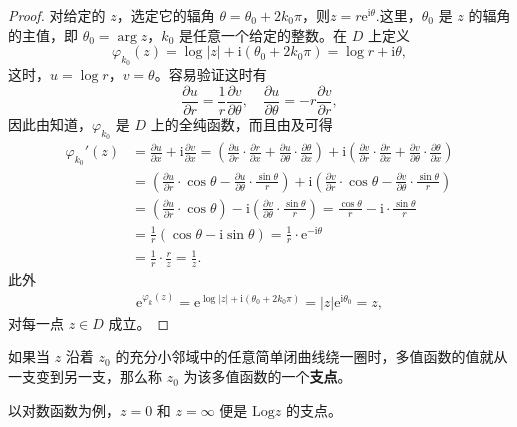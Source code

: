 \documentclass[../../main.tex]{subfiles}
\begin{document}
\begin{proof}
对给定的 \( z \)，选定它的辐角 \( \theta = \theta_0 + 2k_0\pi \)，则$z=r\mathrm{e}^{\mathrm{i}\theta}$.这里，\( \theta_0 \) 是 \( z \) 的辐角的主值，即 \( \theta_0 = \arg z \)，\( k_0 \) 是任意一个给定的整数。在 \( D \) 上定义
\[
\varphi_{k_0}(z) = \log|z| + \mathrm{i}(\theta_0 + 2k_0\pi) = \log r + \mathrm{i}\theta,
\]
这时，\( u = \log r \)，\( v = \theta \)。容易验证这时有
\[
\frac{\partial u}{\partial r} = \frac{1}{r} \frac{\partial v}{\partial \theta},\quad 
\frac{\partial u}{\partial \theta} = -r \frac{\partial v}{\partial r},
\]
因此由知道，\( \varphi_{k_0} \) 是 \( D \) 上的全纯函数，而且由及可得
\begin{align*}
\varphi _{k_0}'(z)&=\frac{\partial u}{\partial x}+\mathrm{i}\frac{\partial v}{\partial x}=\left( \frac{\partial u}{\partial r}\cdot \frac{\partial r}{\partial x}+\frac{\partial u}{\partial \theta}\cdot \frac{\partial \theta}{\partial x} \right) +\mathrm{i}\left( \frac{\partial v}{\partial r}\cdot \frac{\partial r}{\partial x}+\frac{\partial v}{\partial \theta}\cdot \frac{\partial \theta}{\partial x} \right) 
\\
&=\left( \frac{\partial u}{\partial r}\cdot \cos \theta -\frac{\partial u}{\partial \theta}\cdot \frac{\sin \theta}{r} \right) +\mathrm{i}\left( \frac{\partial v}{\partial r}\cdot \cos \theta -\frac{\partial v}{\partial \theta}\cdot \frac{\sin \theta}{r} \right) 
\\
&=\left( \frac{\partial u}{\partial r}\cdot \cos \theta \right) -\mathrm{i}\left( \frac{\partial v}{\partial \theta}\cdot \frac{\sin \theta}{r} \right) =\frac{\cos \theta}{r}-\mathrm{i}\cdot \frac{\sin \theta}{r}
\\
&=\frac{1}{r}\left( \cos \theta -\mathrm{i}\sin \theta \right) =\frac{1}{r}\cdot \mathrm{e}^{-\mathrm{i}\theta}
\\
&=\frac{1}{r}\cdot \frac{r}{z}=\frac{1}{z}.
\end{align*}
此外
\begin{align*}
\mathrm{e}^{\varphi_k(z)} = \mathrm{e}^{\log|z| + \mathrm{i}(\theta_0 + 2k_0\pi)} = |z| \mathrm{e}^{\mathrm{i}\theta_0} = z,
\end{align*}
对每一点 \( z \in D \) 成立。
\end{proof}

\begin{definition}
如果当 \( z \) 沿着 \( z_0 \) 的充分小邻域中的任意简单闭曲线绕一圈时，多值函数的值就从一支变到另一支，那么称 \( z_0 \) 为该多值函数的一个\textbf{支点}。
\end{definition}
\begin{note}
以对数函数为例，\( z = 0 \) 和 \( z = \infty \) 便是 \( \mathrm{Log} z \) 的支点。
\end{note}
\end{document}
